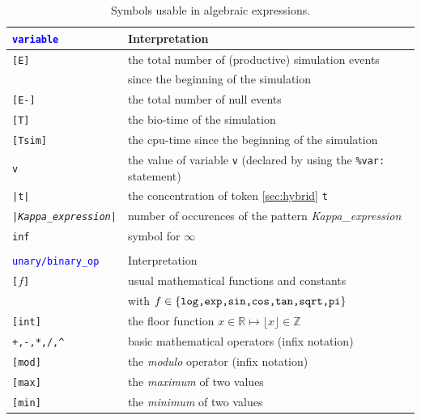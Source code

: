 \documentclass[11pt]{book}
\def\tcb#1{\textcolor{blue}{\ttt{#1}}}
\def\ttt#1{\texttt{#1}}
\def\var#1{{\textquotesingle}#1{\textquotesingle}}
\def\set#1{\{#1\}}
\def\Real{\mathbb R}
\def\Z{\mathbb Z}
\begin{document}
\begin{table}[htbp]
\centering
\caption{Symbols usable in algebraic expressions.%
}
\begin{tabular}{@{} l|l @{} }
\toprule
\ttt{\tcb{variable}} & Interpretation \\
\midrule
\ttt{[E]} & the total number of (productive) simulation events\index{event}\\
& since the beginning of the simulation \\
\ttt{[E-]} & the total number of null events\index{null event}\\
\ttt{[T]} & the bio-time of the simulation \\
\ttt{[Tsim]} & the cpu-time since the beginning of the simulation \\

\ttt{\var{v}} & the value of variable \ttt{\var{v}} (declared by using the \ttt{\%var:} statement) \\
\ttt{|t|} & the concentration of token \ref{sec:hybrid} \ttt{t}\\
\ttt{|\textit{Kappa\_expression}|} & number of occurences of the pattern \textit{Kappa\_expression}\\
\ttt{inf} & symbol for $\infty$ \\\\
\toprule
\ttt{\tcb{unary/binary\_op}} & Interpretation \\
\midrule
\ttt{[}$f$\texttt{]} & usual mathematical functions and constants \\ &with $f\in\set{\hbox{\ttt{log,exp,sin,cos,tan,sqrt,pi}}}$ \\
\ttt{[int]} & the floor function $x\in\Real\mapsto \lfloor x\rfloor\in\Z$ \\
\ttt{+,-,*,/,\textasciicircum} & basic mathematical operators (infix notation)\\
\ttt{[mod]} & the \emph{modulo} operator (infix notation)\\
\ttt{[max]} & the \emph{maximum} of two values \\
\ttt{[min]} & the \emph{minimum} of two values \\
\bottomrule
\end{tabular}
\label{tab:operators}
\end{table}
\end{document}
